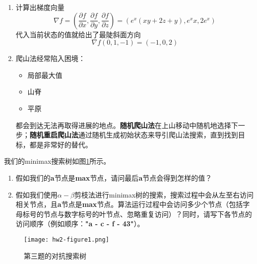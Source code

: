     \begin{solution}
        \begin{enumerate}
            \item 计算出梯度向量
            \begin{equation*}
                \nabla f = \left(\frac{\partial f}{\partial x},\frac{\partial f}{\partial y},\frac{\partial f}{\partial z}\right) = \left(e^x(xy+2z+y),e^xx,2e^x\right)
            \end{equation*}
            代入当前状态的值就给出了最陡斜面方向
            \begin{equation*}
                \nabla f(0,1,-1) = (-1,0,2)
            \end{equation*}
            \item 爬山法经常陷入困境：
            \begin{itemize}
                \item 局部最大值
                \item 山脊
                \item 平原
            \end{itemize}
            都会到达无法再取得进展的地点。\textbf{随机爬山法}在上山移动中随机地选择下一步；\textbf{随机重启爬山法}通过随机生成初始状态来导引爬山法搜索，直到找到目标，都是非常好的替代。
        \end{enumerate}
    \end{solution}

    \begin{problem}
        我们的minimax搜索树如图\ref{hw2-figure1}所示。
        \begin{enumerate}
            \item 假如我们的\textbf{a}节点是\textbf{max}节点，请问最后\textbf{a}节点会得到怎样的值？
            \item 假如我们使用$\alpha-\beta$剪枝法进行minimax树的搜索，搜索过程中会从左至右访问相关节点，且\textbf{a}节点是\textbf{max}节点。算法运行过程中会访问多少个节点（包括字母标号的节点与数字标号的叶节点、忽略重复访问）？同时，请写下各节点的访问顺序（例如顺序：\textbf{"a - c - f - 43"}）。
        \end{enumerate}
\begin{figure}[H]
  \centering
  \texttt{[image: hw2-figure1.png]}
  \caption{第三题的对抗搜索树}
  \label{hw2-figure1}
\end{figure}
    \end{problem}

